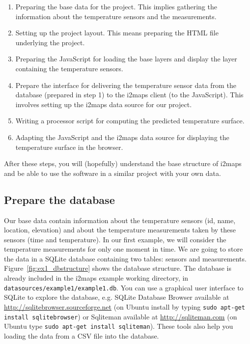 \documentclass[11pt]{article}
\begin{document}
\begin{enumerate}
	\item Preparing the base data for the project. This implies gathering the information about the temperature sensors and the measurements.
	\item Setting up the project layout. This means preparing the HTML file underlying the project.
	\item Preparing the JavaScript for loading the base layers and display the layer containing the temperature sensors.
	\item Prepare the interface for delivering the temperature sensor data from the database (prepared in step 1) to the i2maps client (to the JavaScript). This involves setting up the i2maps data source for our project.
	\item Writing a processor script for computing the predicted temperature surface.
	\item Adapting the JavaScript and the i2maps data source for displaying the temperature surface in the browser.
\end{enumerate}

After these steps, you will (hopefully) understand the base structure of i2maps and be able to use the software in a similar project with your own data.


\subsection{Prepare the database}

Our base data contain information about the temperature sensors (id, name, location, elevation) and about the temperature measurements taken by these sensors (time and temperature). In our first example, we will consider the temperature measurements for only one moment in time. We are going to store the data in a SQLite database containing two tables: sensors and measurements. Figure~\ref{fig:ex1_dbstructure} shows the database structure. The database is already included in the i2maps example working directory, in \texttt{datasources/example1/example1.db}. You can use a graphical user interface to SQLite to explore the database, e.g. SQLite Database Browser available at \url{http://sqlitebrowser.sourceforge.net} (on Ubuntu install by typing \texttt{sudo apt-get install sqlitebrowser}) or Sqliteman available at \url{http://sqliteman.com} (on Ubuntu type \texttt{sudo apt-get install sqliteman}). These tools also help you loading the data from a CSV file into the database.
\end{document}
